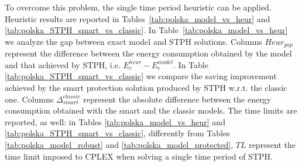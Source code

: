 \documentclass[final,5p,times,twocolumn]{elsarticle}
\begin{document}
  To overcome this problem, the single time period heuristic can be applied. Heuristic results are reported in Tables~\ref{tab:polska_model_vs_heur} and \ref{tab:polska_STPH_smart_vs_classic}.
In Table~\ref{tab:polska_model_vs_heur} we analyze the gap between exact model and STPH solutions.
Columns $Heur_{gap}$ represent the difference between the energy consumption obtained by the model and that achieved by STPH, i.e.  $E_c^{heur}-E_c^{model}$.  In Table \ref{tab:polska_STPH_smart_vs_classic}  we compare the saving improvement achieved by the smart protection solution produced by STPH w.r.t. the classic one. Columns $\Delta_{smart}^{classic}$ represent the absolute difference between the energy consumption obtained with the smart and the classic models. The time limits are reported, as well: in Tables \ref{tab:polska_model_vs_heur} and \ref{tab:polska_STPH_smart_vs_classic}, differently from Tables \ref{tab:polska_model_robust} and \ref{tab:polska_model_protected}, $TL$ represent the time limit imposed to CPLEX when solving a single time period of STPH.
\end{document}
